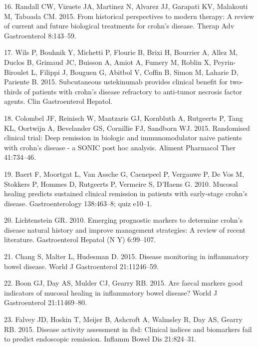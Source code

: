 \documentclass[11pt,]{article}
\begin{document}
\hypertarget{ref-randall_CDbiologics_2015}{}
16. Randall CW, Vizuete JA, Martinez N, Alvarez JJ, Garapati KV,
Malakouti M, Taboada CM. 2015. From historical perspectives to modern
therapy: A review of current and future biological treatments for
crohn's disease. Therap Adv Gastroenterol 8:143--59.

\hypertarget{ref-wils_ust_2015}{}
17. Wils P, Bouhnik Y, Michetti P, Flourie B, Brixi H, Bourrier A, Allez
M, Duclos B, Grimaud JC, Buisson A, Amiot A, Fumery M, Roblin X,
Peyrin-Biroulet L, Filippi J, Bouguen G, Abitbol V, Coffin B, Simon M,
Laharie D, Pariente B. 2015. Subcutaneous ustekinumab provides clinical
benefit for two-thirds of patients with crohn's disease refractory to
anti-tumor necrosis factor agents. Clin Gastroenterol Hepatol.

\hypertarget{ref-colombel_deepremission_2015}{}
18. Colombel JF, Reinisch W, Mantzaris GJ, Kornbluth A, Rutgeerts P,
Tang KL, Oortwijn A, Bevelander GS, Cornillie FJ, Sandborn WJ. 2015.
Randomised clinical trial: Deep remission in biologic and
immunomodulator naive patients with crohn's disease - a SONIC post hoc
analysis. Aliment Pharmacol Ther 41:734--46.

\hypertarget{ref-baert_mucosalhealing_2010}{}
19. Baert F, Moortgat L, Van Assche G, Caenepeel P, Vergauwe P, De Vos
M, Stokkers P, Hommes D, Rutgeerts P, Vermeire S, D'Haens G. 2010.
Mucosal healing predicts sustained clinical remission in patients with
early-stage crohn's disease. Gastroenterology 138:463--8; quiz e10--1.

\hypertarget{ref-Lichtenstein_biomarkers_2010}{}
20. Lichtenstein GR. 2010. Emerging prognostic markers to determine
crohn's disease natural history and improve management strategies: A
review of recent literature. Gastroenterol Hepatol (N Y) 6:99--107.

\hypertarget{ref-Chang_biomarkers_2015}{}
21. Chang S, Malter L, Hudesman D. 2015. Disease monitoring in
inflammatory bowel disease. World J Gastroenterol 21:11246--59.

\hypertarget{ref-Boon_biomarkers_2015}{}
22. Boon GJ, Day AS, Mulder CJ, Gearry RB. 2015. Are faecal markers good
indicators of mucosal healing in inflammatory bowel disease? World J
Gastroenterol 21:11469--80.

\hypertarget{ref-Falvey_biomarkers_2015}{}
23. Falvey JD, Hoskin T, Meijer B, Ashcroft A, Walmsley R, Day AS,
Gearry RB. 2015. Disease activity assessment in ibd: Clinical indices
and biomarkers fail to predict endoscopic remission. Inflamm Bowel Dis
21:824--31.
\end{document}
